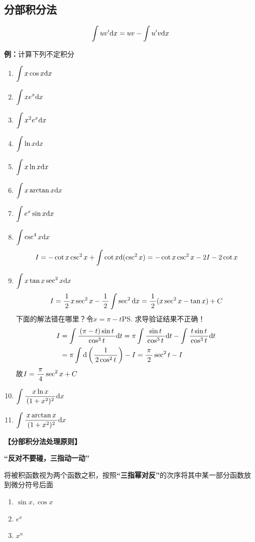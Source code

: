 \subsection{分部积分法}

$$\dint uv'\d x=uv-\dint u'v\d x$$

{\bf 例：}计算下列不定积分
\begin{enumerate}[(1)]
  \setlength{\itemindent}{1cm}
  \item $\dint x\cos x\d x$ 
  \item $\dint xe^x\d x$ 
  \item $\dint x^2e^x\d x$ 
  \item $\dint\ln x\d x$
  \item $\dint x\ln x\d x$ 
  \item $\dint x\arctan x\d x$ 
  \item $\dint e^x\sin x\d x$
  \item $\dint\csc^4x\d x$\\
  $$I=-\cot x\csc^2x+\dint\cot x\d(\csc^2x)=-\cot x\csc^2x-2I-2\cot x$$
  \item $\dint x\tan x\sec^2x\d x$
  $$I=\df12x\sec^2x-\df12\dint\sec^2\d x=\df12(x\sec^2x-\tan x)+C$$
  下面的解法错在哪里？令$x=\pi-t$\ps{求导验证结果不正确！}
  \begin{align}
  I&=\dint\df{(\pi-t)\sin t}{\cos^3t}\d t=\pi\dint\df{\sin t}{\cos^3t}\d t
  -\dint\df{t\sin t}{\cos^3t}\d t\notag\\
  &=\pi\dint\d\left(\df1{2\cos^2t}\right)-I=\df{\pi}2\sec^2t-I\notag
  \end{align}
  故$I=\df{\pi}4\sec^2x+C$
  \item $\dint\df{x\ln x}{(1+x^2)^2}\d x$
  \item $\dint\df{x\arctan x}{(1+x^2)^2}\d x$
\end{enumerate}

\begin{shaded}
{\bf 【分部积分法处理原则】}
\begin{center}
	{\bf “{反对}不要碰，{三指}动一动”} 
\end{center}
将被积函数视为两个函数之积，按照{\bf{“三指幂对反”}}的次序将其中某一部分函数放到微分符号后面 
\begin{enumerate}
  \item $\sin x,\cos x$ 
  \item $e^x$ 
  \item $x^n$
\end{enumerate}
\end{shaded}

